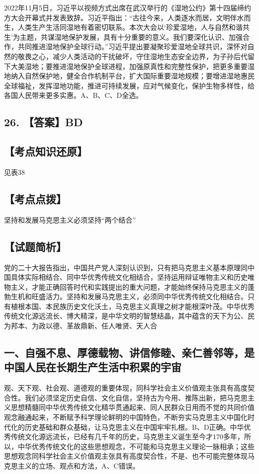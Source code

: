 \documentclass[UTF8,11pt]{ctexart}
\begin{document}
2022年11月5日，习近平以视频方式出席在武汉举行的《湿地公约》第十四届缔约方大会开幕式并发表致辞。习近平指出：“古往今来，人类逐水而居，文明伴水而生，人类生产生活同湿地有着密切联系。本次大会以‘珍爱湿地，人与自然和谐共生’为主题，共谋湿地保护发展，具有十分重要的意义。我们要深化认识、加强合作，共同推进湿地保护全球行动。”习近平提出要凝聚珍爱湿地全球共识，深怀对自然的敬畏之心，减少人类活动的干扰破坏，守住湿地生态安全边界，为子孙后代留下大美湿地；要推进湿地保护全球进程，加强原真性和完整性保护，把更多重要湿地纳入自然保护地，健全合作机制平台，扩大国际重要湿地规模；要增进湿地惠民全球福祉，发挥湿地功能，推进可持续发展，应对气候变化，保护生物多样性，给各国人民带来更多实惠。A、B、C、D全选。


\subsection*{26. 【答案】BD}

\subsection*{【考点知识还原】}

见表38


\subsection*{【考点点拨】}

坚持和发展马克思主义必须坚持“两个结合”


\subsection*{【试题简析】}

党的二十大报告指出，中国共产党人深刻认识到，只有把马克思主义基本原理同中国具体实际相结合、同中华优秀传统文化相结合，坚持运用辩证唯物主义和历史唯物主义，才能正确回答时代和实践提出的重大问题，才能始终保持马克思主义的蓬勃生机和旺盛活力。坚持和发展马克思主义，必须同中华优秀传统文化相结合。只有植根本国、本民族历史文化沃土，马克思主义真理之树才能根深叶茂。中华优秀传统文化源远流长、博大精深，是中华文明的智慧结晶，其中蕴含的天下为公、民为邦本、为政以德、革故鼎新、任人唯贤、天人合


\subsection*{一、自强不息、厚德载物、讲信修睦、亲仁善邻等，是中国人民在长期生产生活中积累的宇宙}

观、天下观、社会观、道德观的重要体现，同科学社会主义价值观主张具有高度契合性。我们必须坚定历史自信、文化自信，坚持古为今用、推陈出新，把马克思主义思想精髓同中华优秀传统文化精华贯通起来、同人民群众日用而不觉的共同价值观念融通起来，不断赋予科学理论鲜明的中国特色，不断夯实马克思主义中国化时代化的历史基础和群众基础，让马克思主义在中国牢牢扎根。B、D正确。中华优秀传统文化源远流长，已经有几千年的历史，马克思主义诞生至今才170多年，所以，中华优秀传统文化的这些思想观念，不可能和马克思主义理论一脉相承；这些思想观念同科学社会主义价值观主张具有高度契合性，不是、也不可能完整体现马克思主义的立场、观点和方法，A、C错误。
\end{document}

